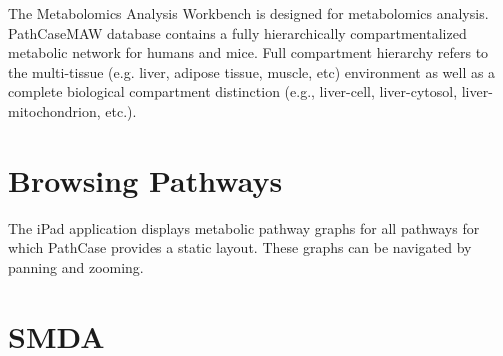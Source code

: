 The Metabolomics Analysis Workbench is designed for metabolomics analysis.
PathCaseMAW database contains a fully hierarchically compartmentalized metabolic
network for humans and mice. Full compartment hierarchy refers to the
multi-tissue (e.g.  liver, adipose tissue, muscle, etc) environment as well as a
complete biological compartment distinction (e.g., liver-cell, liver-cytosol,
liver-mitochondrion, etc.).

\section{Browsing Pathways}

The iPad application displays metabolic pathway graphs for all pathways for
which PathCase provides a static layout. These graphs can be navigated by
panning and zooming.





\section{SMDA}


